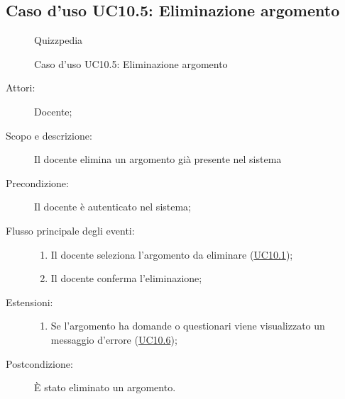 \subsection{Caso d'uso UC10.5: Eliminazione argomento}
        \begin{figure}[H]
            \centering
            \begin{resizedtikzpicture}{\textwidth}
		\begin{umlsystem}[x=0, fill=lightgray!20]{Quizzpedia}
		\end{umlsystem}
            \end{resizedtikzpicture}
            \caption{Caso d'uso UC10.5: Eliminazione argomento}
            \label{fig:UC10.5} 
        \end{figure}
    \begin{description}
\item[Attori:] Docente;
\item[Scopo e descrizione:] Il docente elimina un argomento già presente nel sistema
      \item[Precondizione:] Il docente è autenticato nel sistema;

        \item[Flusso principale degli eventi:] \begin{enumerate}
          \item Il docente seleziona l'argomento da eliminare (\hyperlink{UC10.1}{UC10.1});
          \item Il docente conferma l'eliminazione;

      \end{enumerate}
    \item[Estensioni:]
      \begin{enumerate}
          \item Se l'argomento ha domande o questionari viene visualizzato un messaggio d'errore (\hyperlink{UC10.6}{UC10.6});

      \end{enumerate}
    \item[Postcondizione:] È stato eliminato un argomento.
  \end{description}
\hypertarget{UC10.6}{}
